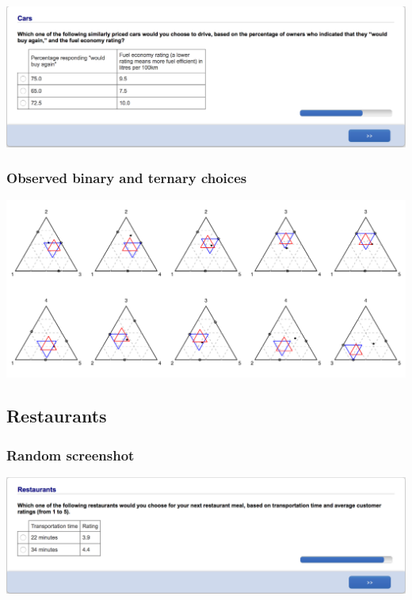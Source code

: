 \documentclass[11pt,letter]{article}
\begin{document}
\includegraphics[width=15cm]{Population_study_design/screenshot_Cars.png}

\subsubsection*{Observed binary and ternary choices}

\includegraphics[width=15cm]{./Population_study_data/Simplexes/Cars.pdf}

\pagebreak

\subsection{Restaurants}



\subsubsection*{Random screenshot}

\includegraphics[width=15cm]{Population_study_design/screenshot_Restaurants.png}
\end{document}
